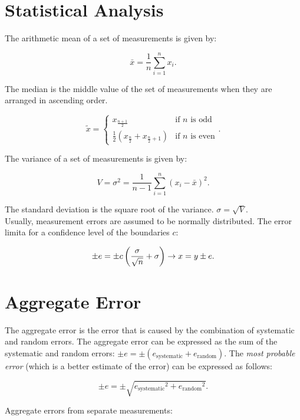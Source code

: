 \documentclass{report}
\begin{document}
\section{Statistical Analysis}

The arithmetic mean of a set of measurements is given by:

\[
	\bar{x} = \frac{1}{n} \sum_{i=1}^{n} x_i
	.\]

The median is the middle value of the set of measurements when they are arranged in ascending order.

\[
	\tilde{x} = \begin{cases}
		x_{\frac{n+1}{2}}                                 & \text{if $n$ is odd}  \\
		\frac{1}{2} (x_{\frac{n}{2}} + x_{\frac{n}{2}+1}) & \text{if $n$ is even}
	\end{cases}
	.\]

The variance of a set of measurements is given by:

\[
	V = \sigma^2 = \frac{1}{n-1} \sum_{i=1}^{n} (x_i - \bar{x})^2
	.\]

The standard deviation is the square root of the variance. $\sigma = \sqrt{V}$.\\

Usually, measurement errors are assumed to be normally distributed. The error limita for a confidence level of the boundaries $c$:

\[
	\pm e = \pm c \left( \frac{\sigma }{\sqrt{n}} + \sigma \right) \rightarrow x = y \pm e
	.\]

\section{Aggregate Error}

The aggregate error is the error that is caused by the combination of systematic and random errors. The aggregate error can be expressed as the sum of the systematic and random errors: $\pm e = \pm(e_\text{systematic} + e_\text{random})$.
The \emph{most probable error} (which is a better estimate of the error) can be expressed as follows:

\[
	\pm e = \pm \sqrt{{e_\text{systematic}}^2 + {e_\text{random}}^2}
	.\]

Aggregate errors from separate measurements:
\end{document}
